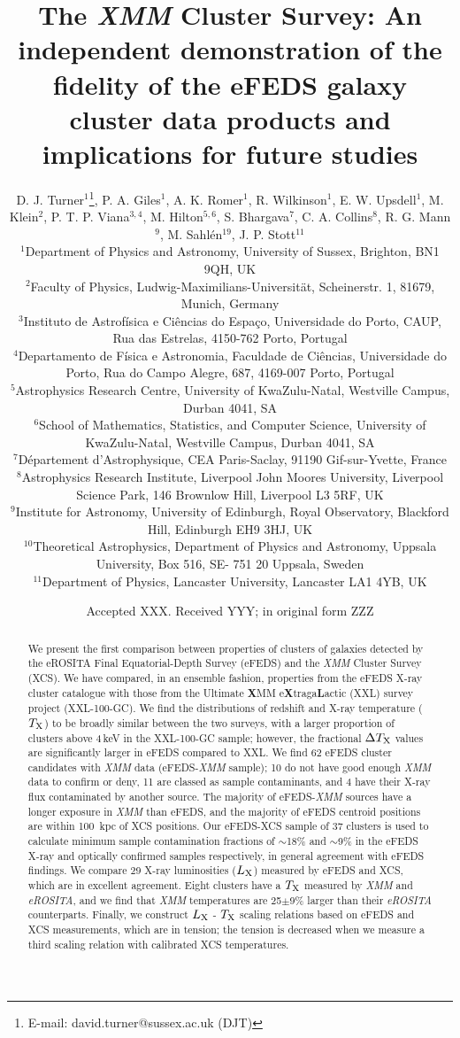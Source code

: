 \documentclass[fleqn,usenatbib]{mnras}
\title[XCS follow-up of eFEDS selected cluster candidates]{The {\em XMM} Cluster Survey: An independent demonstration of the fidelity of the eFEDS galaxy cluster data products and implications for future studies}
\author[D. J. Turner et al.]
{D. J. Turner$^{1}$\thanks{E-mail: david.turner@sussex.ac.uk (DJT)}\orcidA{},
P. A. Giles$^{1}$\orcidB{},
A. K. Romer$^{1}$\orcidC{},
R. Wilkinson$^{1}$\orcidD{},
E. W. Upsdell$^{1}$\orcidG{},
M. Klein$^{2}$,
\newauthor
P. T. P. Viana$^{3,4}$\orcidE{},
M. Hilton$^{5,6}$\orcidJ{},
S. Bhargava$^{7}$,
C. A. Collins$^{8}$,
R. G. Mann$^{9}$\orcidH{},
M. Sahl\'en$^{19}$\orcidI{},
J. P. Stott$^{11}$\orcidF{}
\\
$^{1}$Department of Physics and Astronomy, University of Sussex, Brighton, BN1 9QH, UK\\
$^{2}$Faculty of Physics, Ludwig-Maximilians-Universität, Scheinerstr. 1, 81679, Munich, Germany\\
$^{3}$Instituto de Astrof\'isica e Ci\^{e}ncias do Espa\c co, Universidade do Porto, CAUP, Rua das Estrelas, 4150-762 Porto, Portugal \\
$^{4}$Departamento de F\'isica e Astronomia, Faculdade de Ci\^{e}ncias, Universidade do Porto, Rua do Campo Alegre, 687, 4169-007 Porto, Portugal \\
$^{5}$Astrophysics Research Centre, University of KwaZulu-Natal, Westville Campus, Durban 4041, SA \\
$^{6}$School of Mathematics, Statistics, and Computer Science, University of KwaZulu-Natal, Westville Campus, Durban 4041, SA \\
$^{7}$Département d’Astrophysique, CEA Paris-Saclay, 91190 Gif-sur-Yvette, France\\
$^{8}$Astrophysics Research Institute, Liverpool John Moores University, Liverpool Science Park, 146 Brownlow Hill, Liverpool L3 5RF, UK \\
$^{9}$Institute for Astronomy, University of Edinburgh, Royal Observatory, Blackford Hill, Edinburgh EH9 3HJ, UK \\
$^{10}$Theoretical Astrophysics, Department of Physics and Astronomy, Uppsala University, Box 516, SE- 751 20 Uppsala, Sweden\\
$^{11}$Department of Physics, Lancaster University, Lancaster LA1 4YB, UK 
}
\date{Accepted XXX. Received YYY; in original form ZZZ}
\begin{document}
\label{firstpage}
\pagerange{\pageref{firstpage}--\pageref{lastpage}}
\maketitle

\begin{abstract}
We present the first comparison between properties of clusters of galaxies detected by the eROSITA Final Equatorial-Depth Survey (eFEDS) and the {\em XMM} Cluster Survey (XCS). We have compared, in an ensemble fashion, properties from the eFEDS X-ray cluster catalogue with those from the Ultimate {\bf X}MM e{\bf X}traga{\bf L}actic (XXL) survey project (XXL-100-GC). We find the distributions of redshift and X-ray temperature ($T_{\rm X}$) to be broadly similar between the two surveys, with a larger proportion of clusters above 4\,keV in the XXL-100-GC sample; however, the fractional $\Delta T_{\rm X}$ values are significantly larger in eFEDS compared to XXL. We find 62 eFEDS cluster candidates with {\em XMM} data (eFEDS-{\em XMM} sample); 10 do not have good enough {\em XMM} data to confirm or deny, 11 are classed as sample contaminants, and 4 have their X-ray flux contaminated by another source. The majority of eFEDS-{\em XMM} sources have a longer exposure in {\em XMM} than eFEDS, and the majority of eFEDS centroid positions are within 100~kpc of XCS positions. Our eFEDS-XCS sample of 37 clusters is used to calculate minimum sample contamination fractions of ${\sim}$18\% and ${\sim}$9\% in the eFEDS X-ray and optically confirmed samples respectively, in general agreement with eFEDS findings. We compare 29 X-ray luminosities ($L_{\rm X}$) measured by eFEDS and XCS, which are in excellent agreement. Eight clusters have a $T_{\rm X}$ measured by {\em XMM} and {\em eROSITA}, and we find that {\em XMM} temperatures are 25$\pm$9\% larger than their {\em eROSITA} counterparts. Finally, we construct $L_{\rm X}$ - $T_{\rm X}$ scaling relations based on eFEDS and XCS measurements, which are in tension; the tension is decreased when we measure a third scaling relation with calibrated XCS temperatures.

% 
\end{abstract}
\end{document}
